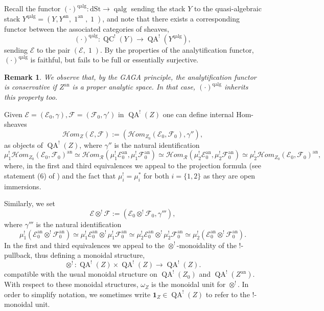 \documentclass[11pt, a4paper]{amsart}
\numberwithin{equation}{section}
\newtheorem{remark}[theorem]{Remark}
\theoremstyle{definition}
\theoremstyle{remark}
\DeclareMathOperator{\id}{1}
\DeclareMathOperator{\an}{an}
\DeclareMathOperator{\QC}{QC}
\DeclareMathOperator{\QA}{QA}
\DeclareMathOperator{\qalg}{\mathrm{qalg}}
\newcommand{\Hhom}{\mathcal{H}om}
\newcommand{\Ee}{\mathcal{E}}
\newcommand{\Ff}{\mathcal{F}}
\newcommand{\Rr}{\mathcal{R}}
\renewcommand{\to}{\longrightarrow}
\begin{document}
Recall the functor $(\cdot)^{\qalg} : \mathrm{dSt} \to \qalg$ sending the stack $Y$ to the quasi-algebraic stack $Y^{\qalg} = (Y, Y^{\an}, \id^{\an}, \id)$, and note that there exists a corresponding functor between the associated categories of sheaves,
\[
(\cdot)^{\qalg} : \QC^!(Y) \to \QA^!(Y^{\qalg}),
\]
sending $\Ee$ to the pair $(\Ee, \id)$. By the properties of the analytification functor, $(\cdot)^{\qalg}$ is faithful, but fails to be full or essentially surjective. 



\begin{remark} 
    We observe that, by the GAGA principle, the analytification functor is conservative if $Z^{\mathrm{an}}$ is a proper analytic space. In that case, $(\cdot)^{\qalg}$ inherits this property too.
\end{remark}


Given $\Ee = (\Ee_0, \gamma), \Ff = (\Ff_0, \gamma')$ in $\QA^!(Z)$ one can define internal Hom-sheaves
\[
\Hhom_Z(\Ee,\Ff) := \left(\Hhom_{Z_0}(\Ee_0, \Ff_0), \gamma'' \right ), 
\]
as objects of $\QA^!(Z)$, where $\gamma''$ is the natural identification 
$$\mu_1^!\Hhom_{Z_0}(\Ee_0, \Ff_0)^{\mathrm{an}} \simeq \Hhom_{\Rr}(\mu_1^!\Ee_0^{\mathrm{an}}, \mu_1^!\Ff_0^{\mathrm{an}}) \simeq \Hhom_{\Rr}(\mu_2^!\Ee_0^{\mathrm{an}}, \mu_2^!\Ff_0^{\mathrm{an}}) \simeq \mu_2^!\Hhom_{Z_0}(\Ee_0, \Ff_0)^{\mathrm{an}},$$
where, in the first and third equivalences we appeal to the projection formula (see statement (6) of \cite[pg.276]{gaitsgory&rozenblyum_1}) and the fact that $\mu_i^! = \mu_i^*$ for both $i = \{1,2\}$ as they are open immersions.

Similarly, we set
\[
\Ee \otimes^! \Ff := (\Ee_0 \otimes^! \Ff_0, \gamma'''),
\]
where $\gamma'''$ is the natural identification
$$\mu_1^!(\Ee_0^{\mathrm{an}} \otimes^! \Ff_0^{\mathrm{an}}) \simeq \mu_1^!\Ee_0^{\mathrm{an}} \otimes^! \mu_1^!\Ff_0^{\mathrm{an}} \simeq \mu_2^!\Ee_0^{\mathrm{an}} \otimes^! \mu_2^!\Ff_0^{\mathrm{an}} \simeq \mu_2^!(\Ee_0^{\mathrm{an}} \otimes^! \Ff_0^{\mathrm{an}}).$$
In the first and third equivalences we appeal to the $\otimes^!$-monoidality of the $!$-pullback, thus defining a monoidal structure, 
\[
\otimes^! : \QA^!(Z) \times \QA^!(Z) \to \QA^!(Z).
\]
compatible with the usual monoidal structure on $\QA^!(Z_0)$ and $\QA^!(Z^{\mathrm{an}})$. With respect to these monoidal structures, $\omega_Z$ is the monoidal unit for $\otimes^!$. In order to simplify notation, we sometimes write $\mathbf{1}_Z \in \QA^!(Z)$ to refer to the $!$-monoidal unit.
\end{document}
